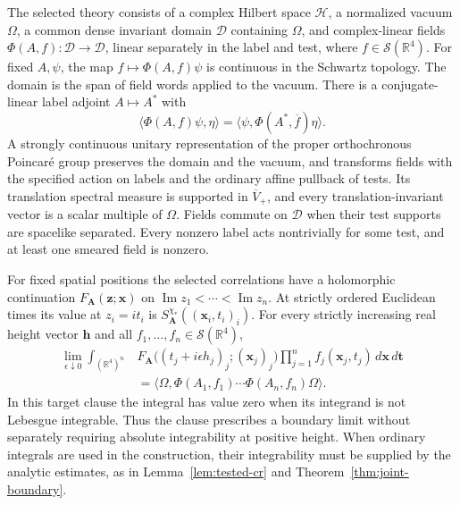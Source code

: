 \begin{definition}\label{ex-reconstructed}
The selected theory consists of a complex Hilbert space \(\mathcal H\),
a normalized vacuum \(\Omega\), a common dense invariant domain
\(\mathcal D\) containing \(\Omega\), and complex-linear fields
\(\Phi(A,f):\mathcal D\to\mathcal D\), linear separately in the label
and test, where
\(f\in\mathcal S(\mathbb R^4)\). For fixed \(A,\psi\), the map
\(f\mapsto\Phi(A,f)\psi\) is continuous in the Schwartz topology.
The domain is the span of field words applied to the vacuum. There is a
conjugate-linear label adjoint \(A\mapsto A^*\) with
\[
 \langle\Phi(A,f)\psi,\eta\rangle
   =\langle\psi,\Phi(A^*,\overline f)\eta\rangle.
\]
A strongly continuous unitary representation of the proper orthochronous
Poincar\'e group preserves the domain and the vacuum, and transforms fields
with the specified action on labels and the ordinary affine pullback of tests.
Its translation spectral measure is supported in \(\overline V_+\), and
every translation-invariant vector is a scalar multiple of \(\Omega\).
Fields commute on \(\mathcal D\) when their test supports are spacelike
separated. Every nonzero label acts nontrivially for some test, and at least
one smeared field is nonzero.

For fixed spatial positions the selected correlations have a holomorphic
continuation \(F_{\boldsymbol A}(\boldsymbol z;\boldsymbol x)\) on
\(\operatorname{Im}z_1<\cdots<\operatorname{Im}z_n\). At strictly ordered
Euclidean times its value at \(z_i=it_i\) is
\(S^{\chi_*}_{\boldsymbol A}((\boldsymbol x_i,t_i)_i)\).
For every strictly increasing real height vector \(\boldsymbol h\) and
all \(f_1,\ldots,f_n\in\mathcal S(\mathbb R^4)\),
\begin{equation}\label{eq:public-selected-boundary}
\begin{split}
 \lim_{\epsilon\downarrow0}\int_{(\mathbb R^4)^n}
 &F_{\boldsymbol A}\bigl((t_j+i\epsilon h_j)_j;
                  (\boldsymbol x_j)_j\bigr)
       \prod_{j=1}^n f_j(\boldsymbol x_j,t_j)\,
                         d\boldsymbol x\,d\boldsymbol t\\
 &=\langle\Omega,\Phi(A_1,f_1)\cdots\Phi(A_n,f_n)\Omega\rangle.
\end{split}
\end{equation}
In this target clause the integral has value zero when its integrand is not
Lebesgue integrable. Thus the clause prescribes a boundary limit without
separately requiring absolute integrability at positive height. When ordinary
integrals are used in the construction, their integrability must be supplied
by the analytic estimates, as in Lemma~\ref{lem:tested-cr} and
Theorem~\ref{thm:joint-boundary}.
\end{definition}

